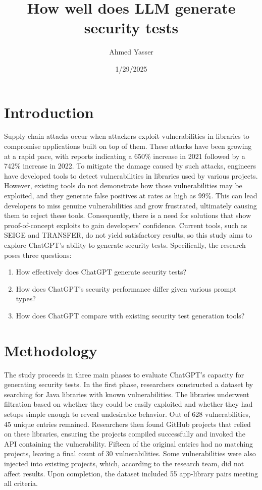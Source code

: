 \documentclass[12pt]{article}
\begin{document}
\title{How well does LLM generate security tests}
\author{Ahmed Yasser}
\date{1/29/2025}
\maketitle

\section{Introduction}
Supply chain attacks occur when attackers exploit vulnerabilities in libraries to compromise applications built on top of them. These attacks have been growing at a rapid pace, with reports indicating a 650\% increase in 2021 followed by a 742\% increase in 2022. To mitigate the damage caused by such attacks, engineers have developed tools to detect vulnerabilities in libraries used by various projects. However, existing tools do not demonstrate how those vulnerabilities may be exploited, and they generate false positives at rates as high as 99\%. This can lead developers to miss genuine vulnerabilities and grow frustrated, ultimately causing them to reject these tools. Consequently, there is a need for solutions that show proof-of-concept exploits to gain developers’ confidence. Current tools, such as SEIGE and TRANSFER, do not yield satisfactory results, so this study aims to explore ChatGPT’s ability to generate security tests. Specifically, the research poses three questions:
\begin{enumerate}
\item How effectively does ChatGPT generate security tests?
\item How does ChatGPT’s security performance differ given various prompt types?
\item How does ChatGPT compare with existing security test generation tools?
\end{enumerate}

\section{Methodology}
The study proceeds in three main phases to evaluate ChatGPT's capacity for generating security tests. In the first phase, researchers constructed a dataset by searching for Java libraries with known vulnerabilities. The libraries underwent filtration based on whether they could be easily exploited and whether they had setups simple enough to reveal undesirable behavior. Out of 628 vulnerabilities, 45 unique entries remained. Researchers then found GitHub projects that relied on these libraries, ensuring the projects compiled successfully and invoked the API containing the vulnerability. Fifteen of the original entries had no matching projects, leaving a final count of 30 vulnerabilities. Some vulnerabilities were also injected into existing projects, which, according to the research team, did not affect results. Upon completion, the dataset included 55 app-library pairs meeting all criteria.
\end{document}
